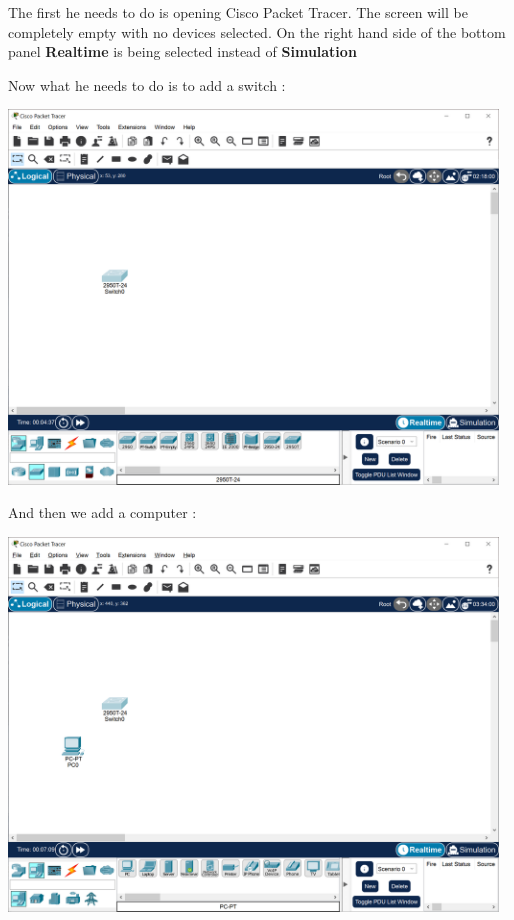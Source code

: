 \documentclass[a4paper,12pt]{article}
\begin{document}
The first he needs to do is opening Cisco Packet Tracer. The screen will be completely empty with no devices selected. On the right hand side of the bottom panel \textbf{Realtime} is being selected instead of \textbf{Simulation} \newline

\clearpage

\noindent Now what he needs to do is to add a switch : \newline

\noindent \includegraphics[width=13cm]{./step-by-step/1.PNG}
\clearpage

\noindent And then we add a computer : \newline

\noindent \includegraphics[width=13cm]{./step-by-step/2.PNG}
\clearpage
\end{document}
